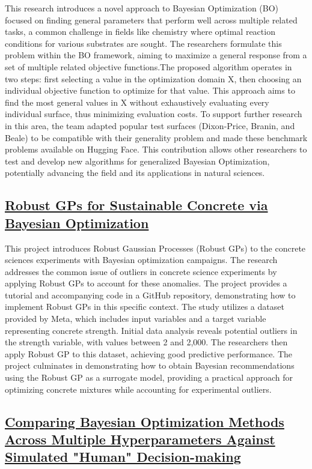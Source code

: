 This research introduces a novel approach to Bayesian Optimization (BO) focused on finding general parameters that perform well across multiple related tasks, a common challenge in fields like chemistry where optimal reaction conditions for various substrates are sought. The researchers formulate this problem within the BO framework, aiming to maximize a general response from a set of multiple related objective functions.The proposed algorithm operates in two steps: first selecting a value in the optimization domain X, then choosing an individual objective function to optimize for that value. This approach aims to find the most general values in X without exhaustively evaluating every individual surface, thus minimizing evaluation costs. To support further research in this area, the team adapted popular test surfaces (Dixon-Price, Branin, and Beale) to be compatible with their generality problem and made these benchmark problems available on Hugging Face. This contribution allows other researchers to test and develop new algorithms for generalized Bayesian Optimization, potentially advancing the field and its applications in natural sciences.
 \subsection*{\href{https://www.youtube.com/watch?v=jSPGCgH31Hc}{Robust GPs for Sustainable Concrete via Bayesian Optimization}}

This project introduces Robust Gaussian Processes (Robust GPs)\cite{altamirano2023robust} to the concrete sciences experiments with Bayesian optimization campaigns. The research addresses the common issue of outliers in concrete science experiments by applying Robust GPs to account for these anomalies. The project provides a tutorial and accompanying code in a GitHub repository, demonstrating how to implement Robust GPs in this specific context. The study utilizes a dataset provided by Meta\cite{ament2310sustainable}, which includes input variables and a target variable representing concrete strength. Initial data analysis reveals potential outliers in the strength variable, with values between 2 and 2,000. The researchers then apply Robust GP to this dataset, achieving good predictive performance. The project culminates in demonstrating how to obtain Bayesian recommendations using the Robust GP as a surrogate model, providing a practical approach for optimizing concrete mixtures while accounting for experimental outliers.
 \subsection*{\href{https://www.youtube.com/watch?v=znXZhSqFtHg}{Comparing Bayesian Optimization Methods Across Multiple Hyperparameters Against Simulated "Human" Decision-making}}

